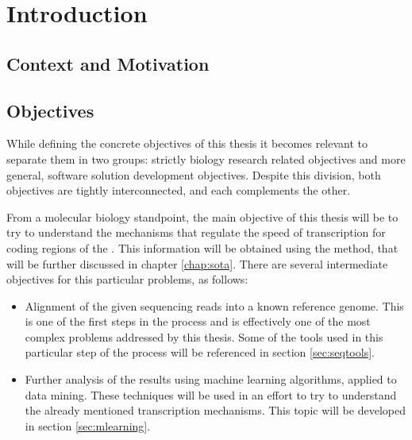 \chapter{Introduction} \label{chap:intro}

\section*{}

\section{Context and Motivation} \label{sec:context}

\section{Objectives} \label{sec:goals}

While defining the concrete objectives of this thesis it becomes relevant to
separate them in two groups: strictly biology research related objectives and
more general, software solution development objectives. Despite this division,
both objectives are tightly interconnected, and each complements the other.

From a molecular biology standpoint, the main objective of this thesis will be
to try to understand the mechanisms that regulate the speed of transcription for
coding regions of the \dna. This information will be obtained using the
\rnaseq{} method, that will be further discussed in chapter \ref{chap:sota}.
There are several intermediate objectives for this particular problems, as
follows:

\begin{itemize}

  \item
  Alignment of the given sequencing reads into a known reference genome. This is
  one of the first steps in the \rnaseq{} process and is effectively one of the
  most complex problems addressed by this thesis. Some of the tools used in this
  particular step of the process will be referenced in section \ref{sec:seqtools}.

  \item
  Further analysis of the \rnaseq{} results using machine learning algorithms,
  applied to data mining. These techniques will be used in an effort to try to
  understand the already mentioned transcription mechanisms. This topic will be
  developed in section \ref{sec:mlearning}.

\end{itemize}

